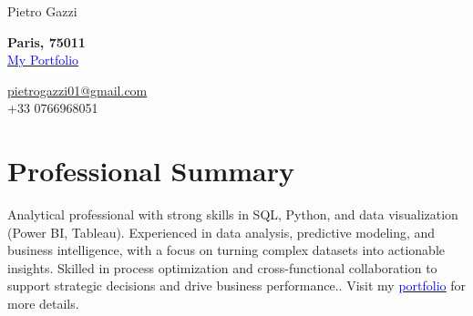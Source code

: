 \documentclass[letterpaper,10.5pt]{article}
\begin{document}
\begin{center}\vspace{-10pt}
    {\LARGE Pietro Gazzi}\\\vspace{-11pt}
        \begin{multicols}{2}
        \begin{flushleft}
            \textbf{Paris, 75011}\\
            \href{https://pietrowei.github.io/Portfolio}{\underline{\textcolor{blue}{My Portfolio}}}
        \end{flushleft}
        \begin{flushright}
            \href{mailto:pietrogazzi01@gmail.com}{pietrogazzi01@gmail.com}\\
            +33 0766968051
        \end{flushright}
    \end{multicols}
\end{center}

\section*{Professional Summary}
Analytical professional with strong skills in SQL, Python, and data visualization (Power BI, Tableau). Experienced in data analysis, predictive modeling, and business intelligence, with a focus on turning complex datasets into actionable insights. Skilled in process optimization and cross-functional collaboration to support strategic decisions and drive business performance.. Visit my \href{https://pietrowei.github.io/Portfolio}{\underline{\textcolor{blue}{portfolio}}} for more details.
\end{document}
